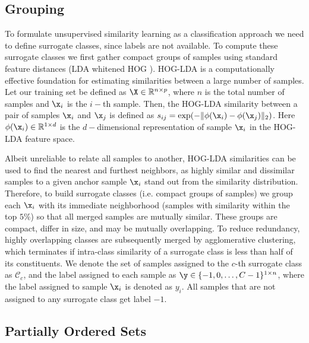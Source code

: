 \documentclass[10pt,twocolumn,letterpaper]{article}
\begin{document}
\subsection{Grouping}\label{sec:clustering}

To formulate unsupervised similarity learning as a classification approach we need to define surrogate classes, since labels are not available. To compute these surrogate classes we first gather compact groups of samples using standard feature distances (LDA whitened HOG \cite{hoglda,josepr,angelacvpr14}). HOG-LDA is a computationally effective foundation for estimating similarities between a large number of samples. Let our training set be defined as $\X \in \mathbb{R}^{n \times p}$, where $n$ is the total number of samples and $\x_i$ is the $i-$th sample. Then, the HOG-LDA similarity between a pair of samples $\x_i$ and $\x_j$ is defined as $s_{ij}=\exp(-\| \phi(\x_i) - \phi(\x_{j})\|_2)$. Here $\phi(\x_i) \in \mathbb{R}^{1 \times d}$ is the $d-$dimensional representation of sample $\x_i$ in the HOG-LDA feature space.

Albeit unreliable to relate all samples to another, HOG-LDA similarities can be used to find the nearest and furthest neighbors, as highly similar and dissimilar samples to a given anchor sample $\x_i$ stand out from the similarity distribution. Therefore, to build surrogate classes (i.e. compact groups of samples) we group each $\x_i$ with its immediate neighborhood (samples with similarity within the top $5\%$)
so that all merged samples are mutually similar. These groups are compact, differ in size, and may be mutually overlapping. To reduce redundancy, highly overlapping classes are subsequently merged by agglomerative clustering, which terminates if intra-class similarity of a surrogate class is less than half of its constituents. We denote the set of samples assigned to the $c$-th surrogate class as $\mathcal{C}_c$, and the label assigned to each sample as $\y \in \{-1, 0,\dots, C-1\}^{1 \times n}$, where the label assigned to sample $\x_i$ is denoted as $y_i$. All samples that are not assigned to any surrogate class get label $-1$.



\subsection{Partially Ordered Sets}
\end{document}
